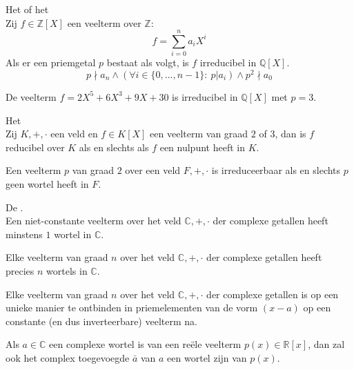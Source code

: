 \documentclass[main.tex]{subfiles}
\begin{document}
\begin{ei}
  Het  of het \\
  Zij $f\in \mathbb{Z}[X]$ een veelterm over $\mathbb{Z}$:
  \[ f = \sum_{i=0}^{n}a_{i}X^{i}\]
  Als er een priemgetal $p$ bestaat als volgt, is $f$ irreducibel in $\mathbb{Q}[X]$.
  \[ p \nmid a_{n} \wedge (\forall i \in \{0,\dotsc,n-1\}:\ p |a_{i}) \wedge p^{2} \nmid a_{0} \]
\end{ei}

\begin{vb}
  De veelterm $f= 2X^{5} + 6X^{3} + 9X + 30$ is irreducibel in $\mathbb{Q}[X]$ met $p=3$.
\end{vb}

\begin{ei}
  Het \\
  Zij $K,+,\cdot$ een veld en $f\in K[X]$ een veelterm van graad $2$ of $3$, dan is $f$ reducibel over $K$ als en slechts als $f$ een nulpunt heeft in $K$.
\end{ei}

\begin{st}
  Een veelterm $p$ van graad $2$ over een veld $F,+,\cdot$ is irreduceerbaar als en slechts $p$ geen wortel heeft in $F$.
\end{st}

\begin{st}
  \label{st:fundamentele-stelling-van-de-algebra}
  De .\\
  Een niet-constante veelterm over het veld $\mathbb{C},+,\cdot$ der complexe getallen heeft minstens $1$ wortel in $\mathbb{C}$.
\end{st}
  
\begin{gev}
  Elke veelterm van graad $n$ over het veld $\mathbb{C},+,\cdot$ der complexe getallen heeft precies $n$ wortels in $\mathbb{C}$.
\end{gev}

\begin{gev}
  Elke veelterm van graad $n$ over het veld $\mathbb{C},+,\cdot$ der complexe getallen is op een unieke manier te ontbinden in priemelementen van de vorm $(x-a)$ op een constante (en dus inverteerbare) veelterm na.
\end{gev}

\begin{st}
  Als $a\in \mathbb{C}$ een complexe wortel is van een re\"ele veelterm $p(x)\in \mathbb{R}[x]$, dan zal ook het complex toegevoegde $\bar{a}$ van $a$ een wortel zijn van $p(x)$.
\end{st}
\end{document}
